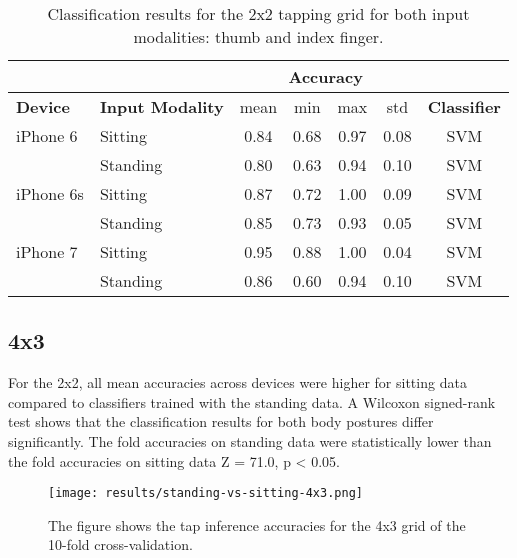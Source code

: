 \begin{appendix}
\begin{table}[h!]
  \centering
\begin{tabular}{|l|l|c|c|c|c|c|}
  \cline{3-6}
  \multicolumn{2}{c}{} & \multicolumn{4}{|c|}{\textbf{Accuracy}}  \\
  \hline
  \textbf{Device} & \textbf{Input Modality} & mean &   min &   max  & std &  \textbf{Classifier} \\
  \hline
	iPhone 6 & Sitting &  0.84 &     0.68 &     0.97 &     0.08 &  SVM \\
	& Standing &      0.80 &     0.63 &     0.94 &     0.10 &  SVM \\
	\hline
	iPhone 6s & Sitting &      0.87 &     0.72 &     1.00 &     0.09 &  SVM \\
	& Standing &      0.85 &     0.73 &     0.93 &     0.05 &  SVM \\
	\hline
	iPhone 7 & Sitting &      0.95 &     0.88 &     1.00 &     0.04 &  SVM \\
	& Standing &      0.86 &     0.60 &     0.94 &     0.10 &  SVM \\
	\hline
\end{tabular}
  \caption{Classification results for the 2x2 tapping grid for both input modalities: thumb and index finger.}
\end{table}


\subsection*{4x3}
For the 2x2, all mean accuracies across devices were higher for sitting data compared to classifiers trained with the standing data. A Wilcoxon signed-rank test shows that the classification results for both body postures differ significantly. The fold accuracies on standing data were statistically lower than the fold accuracies on sitting data Z = 71.0, p < 0.05.

\begin{figure}[h!]
  \centering
  \texttt{[image: results/standing-vs-sitting-4x3.png]}
  \caption{The figure shows the tap inference accuracies for the 4x3 grid of the 10-fold cross-validation.} \label{fig:participation}
\end{figure}


\end{appendix}
